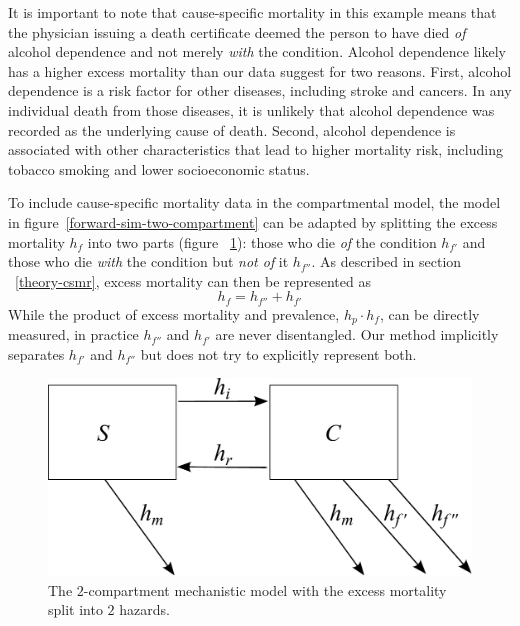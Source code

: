 It is important to note that cause-specific mortality in this example
means that the physician issuing a death certificate deemed the person
to have died \emph{of} alcohol dependence and not merely \emph{with} the
condition.  Alcohol dependence likely has a higher excess mortality
than our data suggest for two reasons.  First, alcohol dependence is
a risk factor for other diseases, including stroke and cancers.  In
any individual death from those diseases, it is unlikely that alcohol
dependence was recorded as the underlying cause of
death.\cite{TK_citation_needed} Second, alcohol dependence is
associated with other characteristics that lead to higher mortality
risk, including tobacco smoking and lower socioeconomic
status.\cite{TK_citation_needed}

To include cause-specific mortality data in the compartmental model,
the model in figure~\ref{forward-sim-two-compartment} can be adapted
by splitting the excess mortality $h_{f}$ into two parts (figure
~\ref{fig:two_compartment_2f}): those who die \emph{of} the
condition $h_{f'}$ and those who die \emph{with} the condition but
\emph{not of} it $h_{f''}$.  As described in section
~\ref{theory-csmr}, excess mortality can then be represented as
    \begin{equation*}
        h_{f} = h_{f''} + h_{f'}
    \end{equation*}
While the product of excess mortality and prevalence, $h_{p} \cdot h_{f}$,
can be directly measured, in practice $h_{f''}$ and $h_{f'}$ are never
disentangled.  Our method implicitly separates $h_{f'}$ and $h_{f''}$
but does not try to explicitly represent both.

    \begin{figure}[h]
        \begin{center}
            \includegraphics[width=\textwidth]{SC2.pdf}
            \caption{The $2$-compartment mechanistic model with the
              excess mortality split into $2$ hazards.}
            \label{fig:two_compartment_2f}
        \end{center}
    \end{figure}

